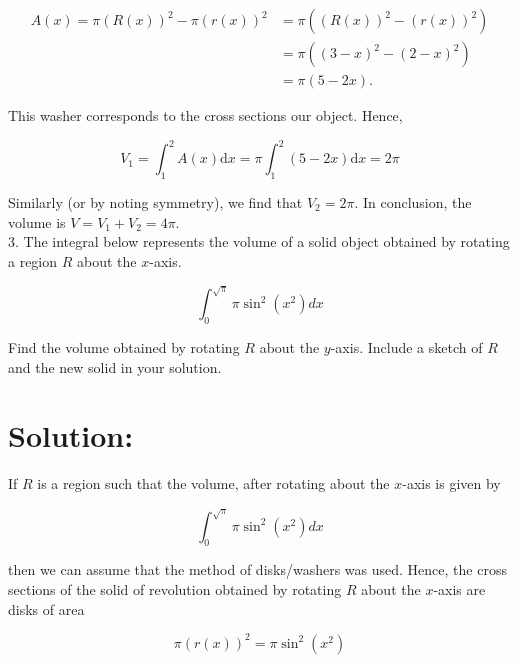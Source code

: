 \documentclass[10pt]{article}
\begin{document}
$$
\begin{aligned}
A(x)=\pi(R(x))^{2}-\pi(r(x))^{2} & =\pi\left((R(x))^{2}-(r(x))^{2}\right) \\
& =\pi\left((3-x)^{2}-(2-x)^{2}\right) \\
& =\pi(5-2 x) .
\end{aligned}
$$

This washer corresponds to the cross sections our object. Hence,

$$
V_{1}=\int_{1}^{2} A(x) \mathrm{d} x=\pi \int_{1}^{2}(5-2 x) \mathrm{d} x=2 \pi
$$

Similarly (or by noting symmetry), we find that $V_{2}=2 \pi$. In conclusion, the volume is $V=V_{1}+V_{2}=4 \pi$.\\
3. The integral below represents the volume of a solid object obtained by rotating a region $R$ about the $x$-axis.

$$
\int_{0}^{\sqrt{\pi}} \pi \sin ^{2}\left(x^{2}\right) d x
$$

Find the volume obtained by rotating $R$ about the $y$-axis. Include a sketch of $R$ and the new solid in your solution.

\section*{Solution:}
If $R$ is a region such that the volume, after rotating about the $x$-axis is given by

$$
\int_{0}^{\sqrt{\pi}} \pi \sin ^{2}\left(x^{2}\right) d x
$$

then we can assume that the method of disks/washers was used. Hence, the cross sections of the solid of revolution obtained by rotating $R$ about the $x$-axis are disks of area

$$
\pi(r(x))^{2}=\pi \sin ^{2}\left(x^{2}\right)
$$
\end{document}
